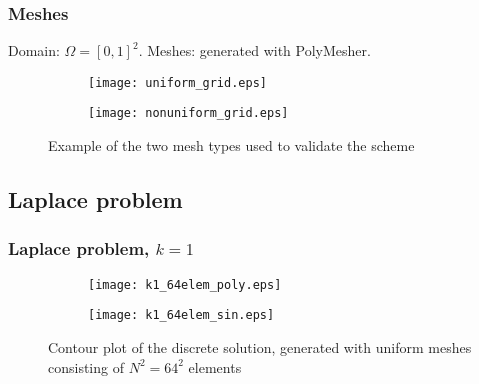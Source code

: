\documentclass[10pt]{beamer}
\begin{document}
\begin{frame} \frametitle{Meshes}

Domain: $\Omega=[0,1]^2$.
Meshes: generated with PolyMesher.

\begin{figure}[H]
	\centering
	\begin{subfigure}{0.49\textwidth}
		\centering
		\texttt{[image: uniform\_grid.eps]}
		\label{fig:uniform}
	\end{subfigure}
	\begin{subfigure}{0.49\textwidth}
		\centering
		\texttt{[image: nonuniform\_grid.eps]}
		\label{fig:voronoi}
	\end{subfigure}
	\caption{Example of the two mesh types used to validate the scheme}
	\label{fig:meshes}
\end{figure} 

	\end{frame}
	
	\subsection{Laplace problem}
	
\begin{frame} \frametitle{Laplace problem, $k=1$}
	
\begin{figure}[H]
	\centering
	\begin{subfigure}{0.49\textwidth}
		\centering
		\texttt{[image: k1\_64elem\_poly.eps]}
		\label{fig:polynomial}
	\end{subfigure}
	\begin{subfigure}{0.49\textwidth}
		\centering
		\texttt{[image: k1\_64elem\_sin.eps]}
		\label{fig:sinsin}
	\end{subfigure}
	\caption{Contour plot of the discrete solution, generated with uniform meshes consisting of $N^2=64^2$ elements}
\end{figure} 
	
\end{frame}
\end{document}

